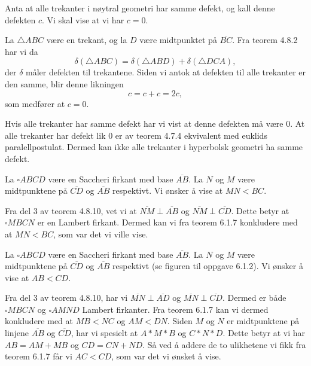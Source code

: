 \begin{oppgave}[6.1.1]
    Anta at alle trekanter i nøytral geometri har samme defekt, og kall denne defekten $c$. 
    Vi skal vise at vi har $c=0$. 

    La $\triangle ABC$ være en trekant, og la $D$ være midtpunktet på $\overline{BC}$. 
    Fra teorem 4.8.2 har vi da
    $$\delta(\triangle ABC) = \delta(\triangle ABD)+\delta(\triangle DCA),$$
    der $\delta$ måler defekten til trekantene. 
    Siden vi antok at defekten til alle trekanter er den samme, blir denne likningen
    $$c=c+c=2c,$$
    som medfører at $c=0$. 

    Hvis alle trekanter har samme defekt har vi vist at denne defekten må være $0$. 
    At alle trekanter har defekt lik $0$ er av teorem 4.7.4 ekvivalent med euklids paralellpostulat. 
    Dermed kan ikke alle trekanter i hyperbolsk geometri ha samme defekt. 

    \begin{figure}[H]
        \centering
         
    \end{figure}
\end{oppgave}

\begin{oppgave}[6.1.2]
    La $\square ABCD$ være en Saccheri firkant med base $\overline{AB}$. 
    La $N$ og $M$ være midtpunktene på $\overline{CD}$ og $\overline{AB}$ respektivt. 
    Vi ønsker å vise at $MN<BC$.

    \begin{figure}[H]
        \centering
         
    \end{figure}
    
    Fra del 3 av teorem 4.8.10, vet vi at $\overline{NM}\perp\overline{AB}$ og $\overline{NM}\perp\overline{CD}$. 
    Dette betyr at $\square MBCN$ er en Lambert firkant. 
    Dermed kan vi fra teorem 6.1.7 konkludere med at $MN<BC$, som var det vi ville vise. 
\end{oppgave}

\begin{oppgave}[6.1.3]
    La $\square ABCD$ være en Saccheri firkant med base $\overline{AB}$. 
    La $N$ og $M$ være midtpunktene på $\overline{CD}$ og $\overline{AB}$ respektivt (se figuren til oppgave 6.1.2).
    Vi ønsker å vise at $AB<CD$. 
    
    Fra del 3 av teorem 4.8.10, har vi $\overline{MN}\perp \overline{AD}$ og $\overline{MN}\perp\overline{CD}$.
    Dermed er både $\square MBCN$ og $\square AMND$ Lambert firkanter. 
    Fra teorem 6.1.7 kan vi dermed konkludere med at $MB<NC$ og $AM<DN$. 
    Siden $M$ og $N$ er midtpunktene på linjene $\overline{AB}$ og $\overline{CD}$, har vi spesielt at $A\ast M\ast B$ og $C\ast N\ast D$. 
    Dette betyr at vi har $AB=AM+MB$ og $CD=CN+ND$. 
    Så ved å addere de to ulikhetene vi fikk fra teorem 6.1.7 får vi $AC<CD$, som var det vi ønsket å vise. 
\end{oppgave}
